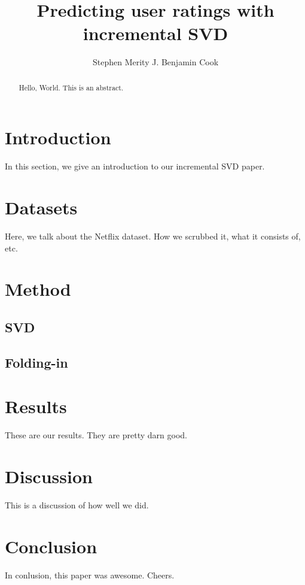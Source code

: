 \documentclass{article} %
\title{Predicting user ratings with incremental SVD}
\author{
Stephen Merity
\And
J. Benjamin Cook
}
\begin{document}
\maketitle

\begin{abstract}
Hello, World. This is an abstract.
\end{abstract}

\section{Introduction}
In this section, we give an introduction to our incremental SVD paper.

\section{Datasets}
Here, we talk about the Netflix dataset. How we scrubbed it, what it consists of, etc.

\section{Method}
\subsection{SVD}
\subsection{Folding-in}

\section{Results}
These are our results. They are pretty darn good.

\begin{comment}
\begin{figure}[H]
\begin{center}
\fbox{\texttt{[image: scatter\_results]}}
\end{center}
\caption{Performance of the edge weight inference algorithm for a graph with $|V| = 100$ and $|E|= 348$}
\label{fig:scatter1}
\end{figure}
\end{comment}

\section{Discussion}
This is a discussion of how well we did.

\section{Conclusion}
In conlusion, this paper was awesome. Cheers.



\end{document}
